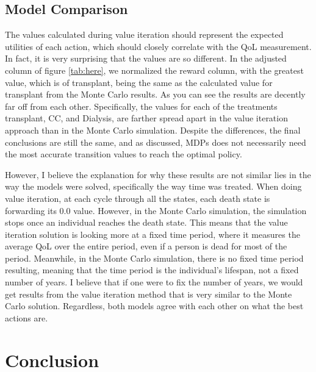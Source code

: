 \documentclass[10pt,twocolumn]{article}
\begin{document}
\subsection{Model Comparison}
The values calculated during value iteration should represent the expected utilities of each action, which should closely correlate with the QoL measurement. In fact, it is very surprising that the values are so different. In the adjusted column of figure \ref{tab:here}, we normalized the reward column, with the greatest value, which is of transplant, being the same as the calculated value for transplant from the Monte Carlo results. As you can see the results are decently far off from each other. Specifically, the values for each of the treatments transplant, CC, and Dialysis, are farther spread apart in the value iteration approach than in the Monte Carlo simulation.
Despite the differences, the final conclusions are still the same, and as discussed, MDPs does not necessarily need the most accurate transition values to reach the optimal policy. 

However, I believe the explanation for why these results are not similar lies in the way the models were solved, specifically the way time was treated. When doing value iteration, at each cycle through all the states, each death state is forwarding its 0.0 value. However, in the Monte Carlo simulation, the simulation stops once an individual reaches the death state. This means that the value iteration solution is looking more at a fixed time period, where it measures the average QoL over the entire period, even if a person is dead for most of the period. Meanwhile, in the Monte Carlo simulation, there is no fixed time period resulting, meaning that the time period is the individual's lifespan, not a fixed number of years. I believe that if one were to fix the number of years, we would get results from the value iteration method that is very similar to the Monte Carlo solution. Regardless, both models agree with each other on what the best actions are.

\section{Conclusion}
\end{document}
